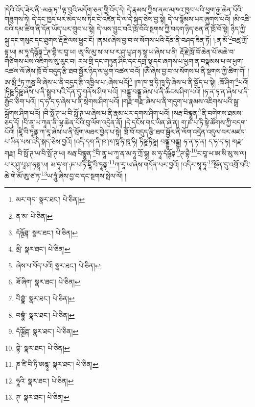 །དེའི་འོད་ཟེར་ནི་:མརྒ་ཏ་\footnote{མར་གད་  སྣར་ཐང་།  པེ་ཅིན། }ལྟ་བུའི་མདོག་ཅན་གྱི་འོད་དེ། དེ་རྣམས་ཀྱིས་ནམ་མཁའ་ཁྱབ་པའི་ཕྱག་རྒྱ་ཆེན་པོའི་གཟུགས་ཏེ། དེ་དང་ཁྱད་པར་མེད་པས་ཏིང་ངེ་འཛིན་དེ་ལ་དེ་སྐད་ཅེས་བྱ་སྟེ། དེ་ལ་སྙོམས་པར་ཞུགས་པའོ། །མི་འཆི་བའི་དམ་ཚིག་ནི་དོན་ཡོད་པར་གྲུབ་པ་སྟེ། དེ་ལས་བྱུང་བའི་ཁྲོ་བོའི་སྔགས་ཀྱི་བདག་ཉིད་ཅན་ནི་ཁྲོ་བོ་སྟེ། ཉིད་ཀྱི་སྐུ་དང་གསུང་དང་ཐུགས་རྡོ་རྗེ་ལས་ཕྱུང་ངོ། །ནམཿ་ཞེས་བྱ་བ་ལ་སོགས་པའི་དོན་ནི་བཤད་ཟིན་ཏོ། །:ན་མོ་\footnote{ན་མ་  པེ་ཅིན། }བཛྲ་ཀྲོ་དྷཱ་ཡ། མ་ཧཱ་དཾཥྚོཏྐ་\footnote{དཾཥྚྲོཊྐ་  སྣར་ཐང་།  པེ་ཅིན། }ཊ་བྷཻ་ར་བཱ་ཡ། ཨཱ་སི་མུ་ས་ལ་པ་ར་ཤུ་པཱ་ཤ་ཧ་སྟཱ་ཡ་ཞེས་པ་ནི། རྡོ་རྗེ་ཁྲོ་བོ་ཆེན་པོ་མཆེ་བ་གཙིགས་པས་འཇིགས་སུ་རུང་བ། རལ་གྲི་དང་གཏུན་ཤིང་དང་དགྲ་སྟ་དང་ཞགས་པ་ཕྱག་ན་བསྣམས་པ་ལ་ཕྱག་འཚལ་ལོ་ཞེས་ཁྲོ་བོ་བདུད་རྩི་ཐབ་སྦྱོར་ཉིད་ལ་ཕྱག་འཚལ་བའོ། །ཨོཾ་ཞེས་བྱ་བ་ལ་སོགས་པ་ནི་སྔགས་ཀྱི་ཚིག་གོ། །ཨ་མྲྀ་\footnote{མྲི་  སྣར་ཐང་།  པེ་ཅིན། }ཏ་ཀུཎྜ་ལི་ཞེས་པ་ནི་བདུད་རྩི་འཁྱིལ་པ་:ཞེས་པའོ།\footnote{ཞེས་པ་བོད་པའོ།  སྣར་ཐང་།  པེ་ཅིན། } །ཁ་ཁ་ཁཱ་ཧི་ཁཱ་ཧི་ཞེས་པ་ནི་སྦོད་པ་སྟེ། :ཟོ་ཤིག་\footnote{ཟོ་ཞིག་  སྣར་ཐང་།  པེ་ཅིན། }པའོ། །ཏིཥྛ་ཏིཥྛ་ཞེས་པ་ནི་སྒྲུབ་པའི་དོན་དུ་གནོས་ཤིག་པའོ། །བནྡྷ་བནྡྷ་ཞེས་པ་ནི་ཆིངས་ཤིག་པའོ། །ཧ་ན་ཧ་ན་ཞེས་པ་ནི་རྒྱོབ་ཅིག་པའོ། །ད་ཧ་ད་ཧ་ཞེས་པ་ནི་སྲེགས་ཤིག་པའོ། །གརྫ་གརྫ་ཞེས་པ་ནི་གདུག་པ་རྣམས་འཇིགས་པའི་སྒྲ་སྒྲོགས་ཤིག་པའོ། །བི་སྥོ་ཊ་ཡ་བི་སྥོ་ཊ་ཡ་ཞེས་པ་ནི་རྣམ་པར་དགས་ཤིག་པའོ། །སརྦ་བིགྷྣཱན་\footnote{བིགྷྣཾ་  སྣར་ཐང་།  པེ་ཅིན། }ནི་བགེགས་ཐམས་ཅད་དོ། །བི་ནཱ་ཡ་ཀཱན་ནི་ལྷ་ཆེན་པོའི་བུ་ལོག་འདྲེན་ནོ། །དེ་དངོས་གང་ཡིན་ཞེ་ན། ག་ཎ་པ་ཏི་སྟེ་ཚོགས་ཀྱི་བདག་པོའོ། །ཛཱི་བི་ཏཱནྟ་ཀ་རཱ་ཞེས་པ་ནི་སྲོག་མཐར་བྱེད་པ་སྟེ། ཁྲོ་བོ་བདུད་རྩི་ཐབ་སྦྱོར་ནི་ལོག་འདྲེན་འདུལ་བར་མཛད་པ་ཡིན་པས་འདི་སྐད་ཅེས་བྱའོ། །འདི་དག་ནི་ཁ་ཁ་ཁཱ་ཧི་ཁཱ་ཧི། ཏིཥྛ་ཏིཥྛ། བནྡྷ་བནྡྷ། ཧ་ན་ཧ་ན། ད་ཧ་ད་ཧ། གརྫ་གརྫ། བི་སྥོ་ཊ་ཡ་བི་སྥོ་ཊ་ཡ། སརྦ་བིགྷྣཱན་\footnote{བགྷྣཾ་  སྣར་ཐང་།  པེ་ཅིན། }བི་ནཱ་ཡ་ཀཱ་ན་མ་ཧཱ་ཀྲོ་དྷཱ། མ་ཧཱ་དཾཥྚོཏྐ་\footnote{དཾཁྚྲོཊྐ་  སྣར་ཐང་།  པེ་ཅིན། }ཊ་བྷཻ་\footnote{བྷེ་  སྣར་ཐང་།  པེ་ཅིན། }ར་བཱ་ཡ་ཨ་སི་མུ་ས་ལ། པ་ར་ཤུ་པཱ་ཤ་ཧསྟཱ་ཡ། མ་ཧཱ་ག་:ཎ་པ་ཏི་ཛཱི་བི་ཏཱནྟ་\footnote{ཎ་ཛི་བི་ཏི་ཨནྷཱ་  སྣར་ཐང་།  པེ་ཅིན། }ཀ་རཱ་ཡ་ཞེས་གདོན་པར་བྱའོ། །འདིར་སྭཱ་ཧཱ་\footnote{ཧཱའི་  སྣར་ཐང་།  པེ་ཅིན། }སྔོན་དུ་འགྲོ་བའི་ཆེ་གེ་མོ་ཨུ་ཙ་ཏ་\footnote{ཊ་  སྣར་ཐང་།  པེ་ཅིན། }ཡ་ཧཱུཾ་ཞེས་བྱ་བ་དང་སྔགས་སྤེལ་ལོ། །
